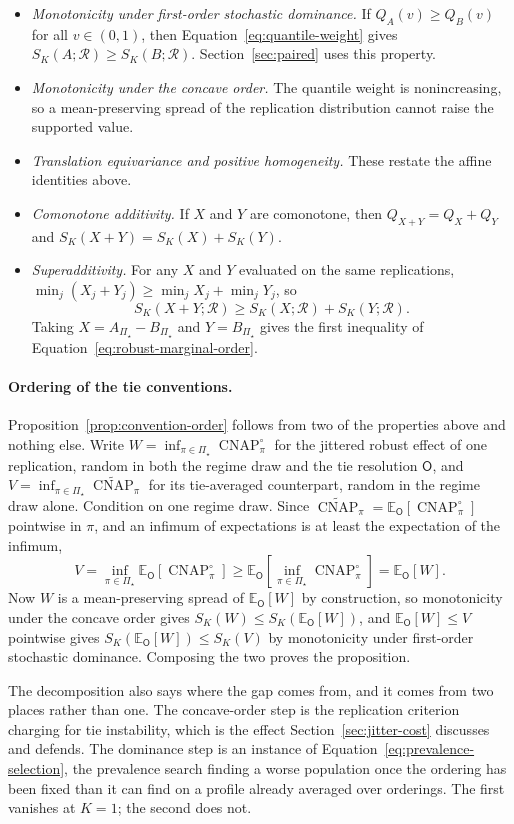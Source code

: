 \documentclass[11pt]{article}
\newcommand{\CNAP}{\operatorname{CNAP}}
\newcommand{\Regime}{\mathcal{R}}
\newcommand{\PSet}{\Pi_\star}
\newcommand{\E}{\mathbb{E}}
\newcommand{\CNAPta}{\widetilde{\CNAP}}
\newcommand{\Rank}{\mathsf{O}}
\newcommand{\CNAPj}{\CNAP^{\circ}}
\theoremstyle{remark}
\begin{document}
\begin{itemize}
\item \emph{Monotonicity under first-order stochastic dominance.} If $Q_A(v)\geq Q_B(v)$ for all $v\in(0,1)$, then Equation~\eqref{eq:quantile-weight} gives $S_K(A;\Regime)\geq S_K(B;\Regime)$. Section~\ref{sec:paired} uses this property.
\item \emph{Monotonicity under the concave order.} The quantile weight is nonincreasing, so a mean-preserving spread of the replication distribution cannot raise the supported value.
\item \emph{Translation equivariance and positive homogeneity.} These restate the affine identities above.
\item \emph{Comonotone additivity.} If $X$ and $Y$ are comonotone, then $Q_{X+Y}=Q_X+Q_Y$ and $S_K(X+Y)=S_K(X)+S_K(Y)$.
\item \emph{Superadditivity.} For any $X$ and $Y$ evaluated on the same replications, $\min_j(X_j+Y_j)\geq\min_jX_j+\min_jY_j$, so
\[
S_K(X+Y;\Regime)
\geq
S_K(X;\Regime)+S_K(Y;\Regime).
\]
Taking $X=A_{\PSet}-B_{\PSet}$ and $Y=B_{\PSet}$ gives the first inequality of Equation~\eqref{eq:robust-marginal-order}.
\end{itemize}

\paragraph{Ordering of the tie conventions.}
Proposition~\ref{prop:convention-order} follows from two of the properties above and nothing else. Write $W=\inf_{\pi\in\PSet}\CNAPj_\pi$ for the jittered robust effect of one replication, random in both the regime draw and the tie resolution $\Rank$, and $V=\inf_{\pi\in\PSet}\CNAPta_\pi$ for its tie-averaged counterpart, random in the regime draw alone. Condition on one regime draw. Since $\CNAPta_\pi=\E_{\Rank}[\CNAPj_\pi]$ pointwise in $\pi$, and an infimum of expectations is at least the expectation of the infimum,
\[
V
=
\inf_{\pi\in\PSet}\E_{\Rank}\left[\CNAPj_\pi\right]
\geq
\E_{\Rank}\left[\inf_{\pi\in\PSet}\CNAPj_\pi\right]
=
\E_{\Rank}[W].
\]
Now $W$ is a mean-preserving spread of $\E_{\Rank}[W]$ by construction, so monotonicity under the concave order gives $S_K(W)\leq S_K(\E_{\Rank}[W])$, and $\E_{\Rank}[W]\leq V$ pointwise gives $S_K(\E_{\Rank}[W])\leq S_K(V)$ by monotonicity under first-order stochastic dominance. Composing the two proves the proposition.

The decomposition also says where the gap comes from, and it comes from two places rather than one. The concave-order step is the replication criterion charging for tie instability, which is the effect Section~\ref{sec:jitter-cost} discusses and defends. The dominance step is an instance of Equation~\eqref{eq:prevalence-selection}, the prevalence search finding a worse population once the ordering has been fixed than it can find on a profile already averaged over orderings. The first vanishes at $K=1$; the second does not.
\end{document}
